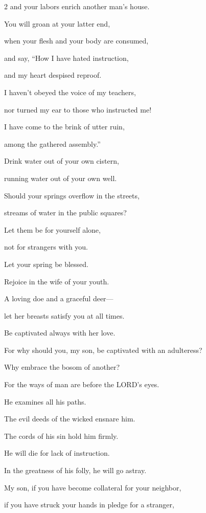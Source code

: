 \begin{multicols}{2}
and your labors enrich another man’s house.


\myverse{}You will groan at your latter end,

when your flesh and your body are consumed,


\myverse{}and say, “How I have hated instruction,

and my heart despised reproof.


\myverse{}I haven’t obeyed the voice of my teachers,

nor turned my ear to those who instructed me!


\myverse{}I have come to the brink of utter ruin,

among the gathered assembly.”


\vspace{\baselineskip} 
\myverse{}Drink water out of your own cistern,

running water out of your own well.


\myverse{}Should your springs overflow in the streets,

streams of water in the public squares?


\myverse{}Let them be for yourself alone,

not for strangers with you.


\myverse{}Let your spring be blessed.

Rejoice in the wife of your youth.


\myverse{}A loving doe and a graceful deer—

let her breasts satisfy you at all times.

Be captivated always with her love.


\myverse{}For why should you, my son, be captivated with an adulteress?

Why embrace the bosom of another?


\myverse{}For the ways of man are before the LORD’s eyes.

He examines all his paths.


\myverse{}The evil deeds of the wicked ensnare him.

The cords of his sin hold him firmly.


\myverse{}He will die for lack of instruction.

In the greatness of his folly, he will go astray.


\mychapter{} \myverse*{}My son, if you have become collateral for your neighbor,

if you have struck your hands in pledge for a stranger,



\end{multicols}
